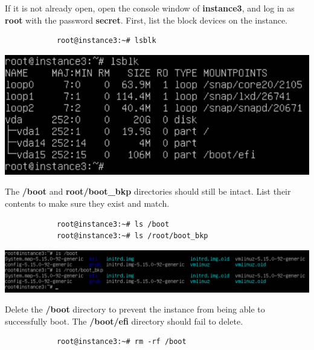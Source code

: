 \documentclass[letterpaper, 12pt]{article}
\begin{document}
\begin{enumerate}
    \begin{labstep}
        If it is not already open, open the console window of \textbf{instance3}, and log in as \textbf{root} with the password \textbf{secret}.
        First, list the block devices on the instance.
        \begin{lstlisting}
            root@instance3:~# lsblk
        \end{lstlisting}

        \begin{center}
            \includegraphics[width=\linewidth]{images/part8/step1.png}
        \end{center}
    \end{labstep}

    \begin{labstep}
        The \textbf{/boot} and \textbf{root/boot\_bkp} directories should still be intact.
        List their contents to make sure they exist and match.
        \begin{lstlisting}
            root@instance3:~# ls /boot
            root@instance3:~# ls /root/boot_bkp
        \end{lstlisting}

        \begin{center}
            \includegraphics[width=\linewidth]{images/part8/step2.png}
        \end{center}
    \end{labstep}

    \begin{labstep}
        Delete the \textbf{/boot} directory to prevent the instance from being able to successfully boot.
        The \textbf{/boot/efi} directory should fail to delete.
        \begin{lstlisting}
            root@instance3:~# rm -rf /boot
        \end{lstlisting}


\end{labstep}
\end{enumerate}
\end{document}

